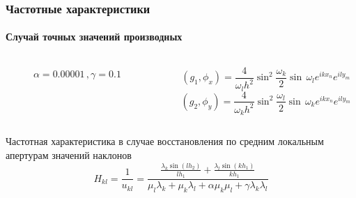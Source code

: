 \documentclass[11pt]{beamer}
\begin{document}
\begin{frame}
\frametitle{Частотные характеристики}
\framesubtitle{Случай точных значений производных}
\begin{columns}
\begin{column}{0.4\linewidth}
\begin{figure}[H]
\caption{$\alpha = 0.00001\,,\gamma = 0.1$}
\end{figure}
\end{column}
\begin{column}{0.5\textwidth}
$$(g_1, \phi_x) = \frac{4}{\omega_l h^2}  \sin^2\frac{\omega_k}{2}  \sin\,\omega_l e^{ikx_n}e^{ily_m}$$
$$(g_2, \phi_y) = \frac{4}{\omega_k h^2}  \sin^2\frac{\omega_l}{2}  \sin\,\omega_k e^{ikx_n} e^{ily_m}$$
\end{column}

\end{columns}
\begin{block}{Частотная характеристика в случае восстановления по средним локальным апертурам значений наклонов}
$$
H_{kl} = \frac{1}{u_{kl}} = \frac{\frac{\lambda_k \sin(lh_2)}{lh_1} + \frac{\lambda_l \sin(kh_1)}{kh_1}}{\mu_l \lambda_k + \mu_k \lambda_l + \alpha \mu_k \mu_l + \gamma \lambda_k \lambda_l}
$$
\end{block}
\end{frame}
\end{document}
